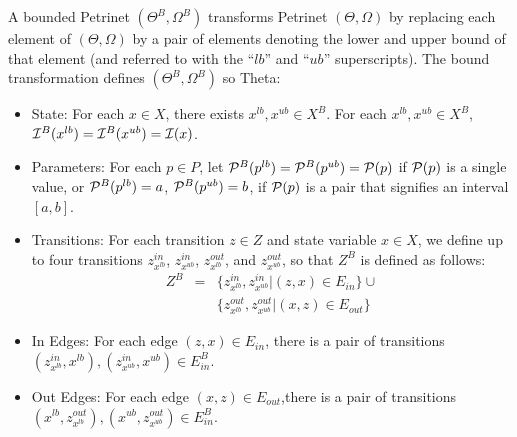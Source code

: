 \begin{definition}
    A bounded Petrinet $(\Theta^B, \Omega^B)$ transforms Petrinet $(\Theta,
    \Omega)$ by replacing each element of $(\Theta, \Omega)$ by
    a pair of elements denoting the lower and upper bound of that element (and
    referred to with the ``$lb$'' and ``$ub$'' superscripts).  The bound transformation defines $(\Theta^B, \Omega^B)$ so Theta:
    \begin{itemize}
        \item State: For each $x \in X$,  there exists $x^{lb}, x^{ub} \in X^B$.   For each $x^{lb}, x^{ub} \in X^B$, ${\cal
        I}^B(x^{lb}) = {\cal I}^B(x^{ub}) = {\cal I}(x)$.
            \item Parameters: For each $p \in P$, let ${\cal P}^B(p^{lb}) = {\cal P}^B(p^{ub}) = {\cal P}(p)$ if ${\cal P}(p)$ is a single value, or  ${\cal P}^B(p^{lb}) = a$, ${\cal P}^B(p^{ub}) = b$, if ${\cal P}(p)$ is a pair that signifies an interval $[a, b]$. 
            \item Transitions: For each transition $z \in Z$ and state variable $x\in X$, we define up to four transitions $z^{in}_{x^{lb}}$, $z^{in}_{x^{ub}}$, $z^{out}_{x^{lb}}$, and $z^{out}_{x^{ub}}$, so that $Z^B$ is defined as follows:
            \begin{eqnarray*}
                Z^B &=& \{z^{in}_{x^{lb}}, z^{in}_{x^{ub}} | (z, x) \in E_{in} \}\cup\\ 
                &&\{z^{out}_{x^{lb}}, z^{out}_{x^{ub}} | (x,z) \in E_{out} \}
            \end{eqnarray*}
            
            \item In Edges: For each edge $(z, x) \in E_{in}$, there is a pair of transitions $(z^{in}_{x^{lb}}, x^{lb} ), (z^{in}_{x^{ub}}, x^{ub}) \in E^B_{in}$.
            \item Out Edges: For each edge $(x, z) \in E_{out}$,there is a pair of transitions $(x^{lb}, z^{out}_{x^{lb}}), (x^{ub}, z^{out}_{x^{ub}}) \in E^B_{in}$.
    

\end{itemize}
\end{definition}
